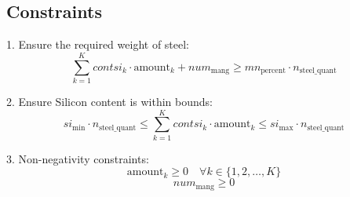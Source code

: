 \documentclass{article}
\begin{document}
\subsection*{Constraints}
1. Ensure the required weight of steel:
\[
\sum_{k=1}^{K} contsi_k \cdot \text{amount}_k + num_{\text{mang}} \geq mn_{\text{percent}} \cdot n_{\text{steel\_quant}}
\]

2. Ensure Silicon content is within bounds:
\[
si_{\text{min}} \cdot n_{\text{steel\_quant}} \leq \sum_{k=1}^{K} contsi_k \cdot \text{amount}_k \leq si_{\text{max}} \cdot n_{\text{steel\_quant}}
\]

3. Non-negativity constraints:
\[
\text{amount}_k \geq 0 \quad \forall k \in \{1, 2, \ldots, K\}
\]
\[
num_{\text{mang}} \geq 0
\]
\end{document}
